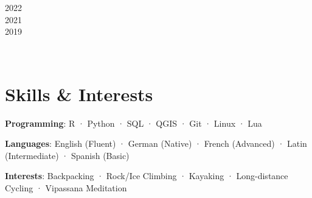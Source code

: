     \hfill 
    \begin{minipage}{.20\linewidth}\begin{flushright}
        2022 \\
        2021 \\
        2019
    	\end{flushright}\end{minipage}
\\

\vspace{5pt}
\section{Skills \& Interests}
\vspace{5pt}
     \begin{description}[font=$\bullet$]
     \vspace{-5pt}
\item{\textbf{Programming}: R · Python · SQL · QGIS · Git · Linux · Lua}
    \vspace{-6pt}
\item{\textbf{Languages}: English (Fluent) · German (Native) · French (Advanced) · Latin (Intermediate) · Spanish (Basic)}
\vspace{-6pt}
\item{\textbf{Interests}: Backpacking · Rock/Ice Climbing · Kayaking · Long-distance Cycling · Vipassana Meditation}
        \end{description} 
        \\



